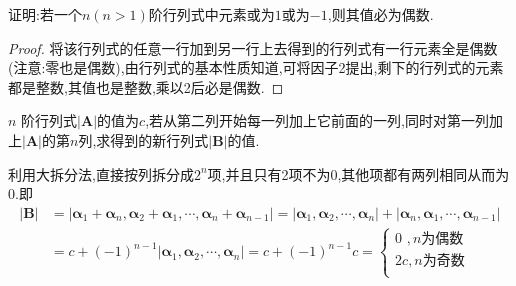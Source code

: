 \documentclass[../../main.tex]{subfiles}
\begin{document}
\begin{example}
证明:若一个\(n(n>1)\)阶行列式中元素或为\(1\)或为\(-1\),则其值必为偶数.
\end{example}
\begin{proof}
将该行列式的任意一行加到另一行上去得到的行列式有一行元素全是偶数(注意:零也是偶数),由行列式的基本性质知道,可将因子2提出,剩下的行列式的元素都是整数,其值也是整数,乘以2后必是偶数.
\end{proof}

\begin{example}
\(n\) 阶行列式\(\vert \boldsymbol{A}\vert\)的值为\(c\),若从第二列开始每一列加上它前面的一列,同时对第一列加上\(\vert \boldsymbol{A}\vert\)的第\(n\)列,求得到的新行列式\(\vert \boldsymbol{B}\vert\)的值.
\end{example}
\begin{solution}
利用大拆分法,直接按列拆分成$2^n$项,并且只有2项不为0,其他项都有两列相同从而为0.即
\begin{align*}
\left| \boldsymbol{B} \right|&=\left| \boldsymbol{\alpha }_1+\boldsymbol{\alpha }_n,\boldsymbol{\alpha }_2+\boldsymbol{\alpha }_1,\cdots ,\boldsymbol{\alpha }_n+\boldsymbol{\alpha }_{n-1} \right|
=\left| \boldsymbol{\alpha }_1,\boldsymbol{\alpha }_2,\cdots ,\boldsymbol{\alpha }_n \right|+\left| \boldsymbol{\alpha }_n,\boldsymbol{\alpha }_1,\cdots ,\boldsymbol{\alpha }_{n-1} \right|
\\
&=c+\left( -1 \right) ^{n-1}\left| \boldsymbol{\alpha }_1,\boldsymbol{\alpha }_2,\cdots ,\boldsymbol{\alpha }_n \right|
=c+\left( -1 \right) ^{n-1}c
=\begin{cases}
0 \,\,,n\text{为偶数}\\
2c,n\text{为奇数}\\
\end{cases}
\end{align*}
\end{solution}
\end{document}

